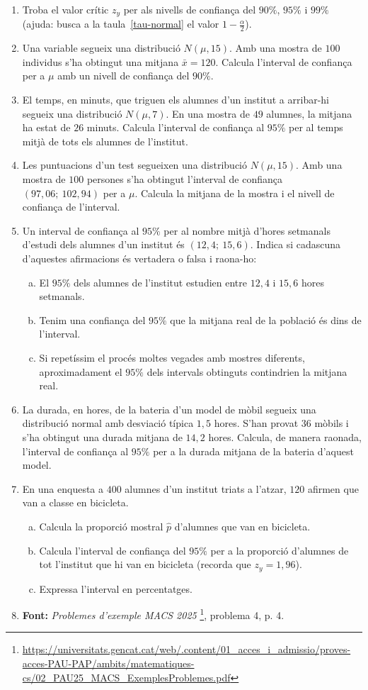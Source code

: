 \begin{enumerate}
 \item Troba el valor crític $z_y$ per als nivells de confiança del $90\%$, $95\%$ i $99\%$ (ajuda: busca a la taula~\ref{tau-normal} el valor $1-\frac{\alpha}{2}$).
 \item Una variable segueix una distribució $N(\mu, 15)$. Amb una mostra de $100$ individus s'ha obtingut una mitjana $\bar{x}=120$. Calcula l'interval de confiança per a $\mu$ amb un nivell de confiança del $90\%$.
 \item  El temps, en minuts, que triguen els alumnes d'un institut a arribar-hi segueix una distribució $N(\mu, 7)$. En una mostra de $49$ alumnes, la mitjana ha estat de $26$ minuts. Calcula l'interval de confiança al $95\%$ per al temps mitjà de tots els alumnes de l'institut.
 \item  Les puntuacions d'un test segueixen una distribució $N(\mu, 15)$. Amb una mostra de $100$ persones s'ha obtingut l'interval de confiança $(97,06;\ 102,94)$ per a $\mu$. Calcula la mitjana de la mostra i el nivell de confiança de l'interval.
 \item Un interval de confiança al $95\%$ per al nombre mitjà d'hores setmanals d'estudi dels alumnes d'un institut és $(12,4;\ 15,6)$. Indica si cadascuna d'aquestes afirmacions és vertadera o falsa i raona-ho:
 \begin{enumerate}[a)]
  \item El $95\%$ dels alumnes de l'institut estudien entre $12,4$ i $15,6$ hores setmanals.
  \item Tenim una confiança del $95\%$ que la mitjana real de la població és dins de l'interval.
  \item Si repetíssim el procés moltes vegades amb mostres diferents, aproximadament el $95\%$ dels intervals obtinguts contindrien la mitjana real.
 \end{enumerate}
 \item La durada, en hores, de la bateria d'un model de mòbil segueix una distribució normal amb desviació típica $1,5$ hores. S'han provat $36$ mòbils i s'ha obtingut una durada mitjana de $14,2$ hores. Calcula, de manera raonada, l'interval de confiança al $95\%$ per a la durada mitjana de la bateria d'aquest model.
 \item En una enquesta a $400$ alumnes d'un institut triats a l'atzar, $120$ afirmen que van a classe en bicicleta.
 \begin{enumerate}[a)]
  \item Calcula la proporció mostral $\hat{p}$ d'alumnes que van en bicicleta.
  \item Calcula l'interval de confiança del $95\%$ per a la proporció d'alumnes de tot l'institut que hi van en bicicleta (recorda que $z_y=1,96$).
  \item Expressa l'interval en percentatges.
 \end{enumerate}
 \item \textbf{Font:} \textit{Problemes d'exemple MACS 2025} \footnote{\url{https://universitats.gencat.cat/web/.content/01_acces_i_admissio/proves-acces-PAU-PAP/ambits/matematiques-cs/02_PAU25_MACS_ExemplesProblemes.pdf}\label{macs-exemples}}, problema 4, p. 4.


\end{enumerate}

